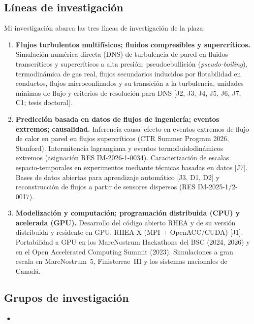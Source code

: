 \documentclass[11pt]{article}
\begin{document}
\subsection{L\'ineas de investigaci\'on}
Mi investigaci\'on abarca las tres l\'ineas de investigaci\'on de la plaza:
\begin{enumerate}
  \item \textbf{Flujos turbulentos multif\'isicos; fluidos compresibles y supercr\'iticos.}
  Simulaci\'on num\'erica directa (DNS) de turbulencia de pared en fluidos transcr\'iticos y
  supercr\'iticos a alta presi\'on: pseudoebullici\'on (\emph{pseudo-boiling}),
  termodin\'amica de gas real, flujos secundarios inducidos por flotabilidad en conductos,
  flujos microconfinados y su transici\'on a la turbulencia, unidades m\'inimas de flujo y
  criterios de resoluci\'on para DNS [J2, J3, J4, J5, J6, J7, C1; tesis doctoral].
  \item \textbf{Predicci\'on basada en datos de flujos de ingenier\'ia; eventos extremos;
  causalidad.} Inferencia causa--efecto en eventos extremos de flujo de calor en pared en
  flujos supercr\'iticos (CTR Summer Program 2026, Stanford). Intermitencia lagrangiana y
  eventos termofluidodin\'amicos extremos (asignaci\'on RES IM-2026-1-0034).
  Caracterizaci\'on de escalas espacio-temporales en experimentos mediante t\'ecnicas basadas
  en datos [J7]. Bases de datos abiertas para aprendizaje autom\'atico [J3, D1, D2] y
  reconstrucci\'on de flujos a partir de sensores dispersos (RES IM-2025-1/2-0017).
  \item \textbf{Modelizaci\'on y computaci\'on; programaci\'on distribuida (CPU) y acelerada
  (GPU).} Desarrollo del c\'odigo abierto RHEA y de su versi\'on distribuida y residente en
  GPU, RHEA-X (MPI + OpenACC/CUDA) [J1]. Portabilidad a GPU en los MareNostrum Hackathons
  del BSC (2024, 2026) y en el Open Accelerated Computing Summit (2023). Simulaciones a gran
  escala en MareNostrum~5, Finisterrae~III y los sistemas nacionales de Canad\'a.
\end{enumerate}

\subsection{Grupos de investigaci\'on}
\begin{itemize}
  \item {}
\end{itemize}
\end{document}

